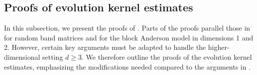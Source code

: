 \subsection{Proofs of evolution kernel estimates}\label{ks}

In this subsection, we present the proofs of . 
Parts of the proofs parallel those in \cite{YY_25,DYYY25,RBSO1D} for random band matrices and for the block Anderson model in dimensions 1 and 2. However, certain key arguments must be adapted to handle the higher-dimensional setting $d \ge 3$. We therefore outline the proofs of the evolution kernel estimates, emphasizing the modifications needed compared to the arguments in \cite{YY_25,DYYY25,RBSO1D}. 

